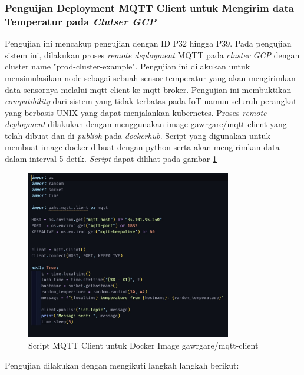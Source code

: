 \subsubsection{Penguijan Deployment MQTT Client untuk Mengirim data Temperatur pada \textit{Clutser GCP}}

Pengujian ini mencakup pengujian dengan ID P32 hingga P39. Pada pengujian sistem ini, dilakukan proses \textit{remote deployment} MQTT pada \textit{cluster GCP} dengan cluster name "prod-cluster-example". Pengujian ini dilakukan untuk mensimulasikan node sebagai sebuah sensor temperatur yang akan mengirimkan data sensornya melalui mqtt client ke mqtt broker. Pengujian ini membuktikan  \textit{compatibility} dari sistem yang tidak terbatas pada IoT namun seluruh perangkat yang berbasis UNIX yang dapat menjalankan kubernetes. Proses \textit{remote deployment} dilakukan dengan menggunakan image gawrgare/mqtt-client yang telah dibuat dan di \textit{publish} pada \textit{dockerhub}. Script yang digunakan untuk membuat image docker dibuat dengan python serta akan mengirimkan data dalam interval 5 detik. \textit{Script} dapat dilihat pada gambar \ref{fig:pengujian-gcp-script-docker-images}

\begin{figure}[ht]
  \centering
  \includegraphics[width=0.8\textwidth]{resources/chapter-4/pengujian/pengujian-gcp-docker-image.jpg}
  \caption{Script MQTT Client untuk Docker Image gawrgare/mqtt-client}
  \label{fig:pengujian-gcp-script-docker-images}
\end{figure}

Pengujian dilakukan dengan mengikuti langkah langkah berikut:

